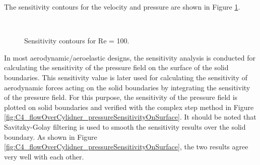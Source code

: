 %
The sensitivity contours for the velocity and pressure are shown in Figure \ref{fig:C4_flowOverCylinderSensitivityContour}.
%
\begin{figure}[H]
    \centering
    \quad
    \\
    \caption{Sensitivity contours for Re = 100.}
    \label{fig:C4_flowOverCylinderSensitivityContour}
\end{figure}
%
In most aerodynamic/aeroelastic designs, the sensitivity analysis is conducted for calculating the sensitivity of the pressure field on the surface of the solid boundaries. This sensitivity value is later used for calculating the sensitivity of aerodynamic forces acting on the solid boundaries by integrating the sensitivity of the pressure field. For this purpose, the sensitivity of the pressure field is plotted on solid boundaries and verified with the complex step method in Figure \ref{fig:C4_flowOverCylidner_pressureSensitivityOnSurface}. It should be noted that Savitzky-Golay \cite{gorry1990general} filtering is used to smooth the sensitivity results over the solid boundary. As shown in Figure \ref{fig:C4_flowOverCylidner_pressureSensitivityOnSurface}, the two results agree very well with each other.
